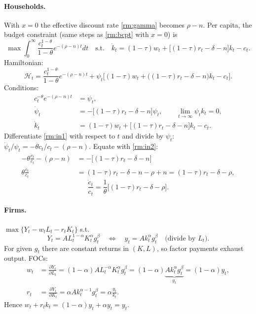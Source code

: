 \paragraph{Households.} With $x=0$ the effective discount rate \eqref{rm:gamma} becomes $\rho-n$. Per capita, the budget constraint (same steps as \eqref{rm:bcpt} with $x=0$) is
\[
\max\int_0^\infty\frac{c_t^{1-\theta}}{1-\theta}e^{-(\rho-n)t}dt\quad\text{s.t.}\quad
\dot k_t=(1-\tau)w_t+\big[(1-\tau)r_t-\delta-n\big]k_t-c_t .
\]
Hamiltonian:
\[
\mathcal H_t=\frac{c_t^{1-\theta}}{1-\theta}e^{-(\rho-n)t}+\psi_t\Big[(1-\tau)w_t+\big((1-\tau)r_t-\delta-n\big)k_t-c_t\Big].
\]
Conditions:
\begin{align}
c_t^{-\theta}e^{-(\rho-n)t}&=\psi_t, \label{rm:in1}\\
\dot\psi_t&=-\big[(1-\tau)r_t-\delta-n\big]\psi_t,\qquad \lim_{t\to\infty}\psi_tk_t=0, \label{rm:in2}\\
\dot k_t&=(1-\tau)w_t+\big[(1-\tau)r_t-\delta-n\big]k_t-c_t . \label{rm:in3}
\end{align}
Differentiate \eqref{rm:in1} with respect to $t$ and divide by $\psi_t$: $\dot\psi_t/\psi_t=-\theta\dot c_t/c_t-(\rho-n)$. Equate with \eqref{rm:in2}:
\begin{align*}
-\theta\frac{\dot c_t}{c_t}-(\rho-n)&=-\big[(1-\tau)r_t-\delta-n\big]\\
\theta\frac{\dot c_t}{c_t}&=(1-\tau)r_t-\delta-n-\rho+n=(1-\tau)r_t-\delta-\rho,
\end{align*}
\begin{equation}
\frac{\dot c_t}{c_t}=\frac1\theta\big[(1-\tau)r_t-\delta-\rho\big]. \label{rm:in4}
\end{equation}

\paragraph{Firms.} $\max\{Y_t-w_tL_t-r_tK_t\}$ s.t.
\begin{equation}
Y_t=AL_t^{1-\alpha}K_t^\alpha g_t^\beta\quad\Longleftrightarrow\quad y_t=Ak_t^\alpha g_t^\beta\quad\text{(divide by $L_t$)}. \label{rm:in5}
\end{equation}
For given $g_t$ there are constant returns in $(K,L)$, so factor payments exhaust output. FOCs:
\begin{align}
w_t&=\frac{\partial Y_t}{\partial L_t}=(1-\alpha)AL_t^{-\alpha}K_t^\alpha g_t^\beta=(1-\alpha)\underbrace{Ak_t^\alpha g_t^\beta}_{y_t}=(1-\alpha)y_t, \label{rm:in6}\\
r_t&=\frac{\partial Y_t}{\partial K_t}=\alpha Ak_t^{\alpha-1}g_t^\beta=\alpha\frac{y_t}{k_t}. \label{rm:in7}
\end{align}
Hence $w_t+r_tk_t=(1-\alpha)y_t+\alpha y_t=y_t$.


